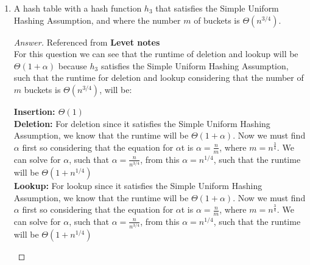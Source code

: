 \documentclass[11pt]{article}
\theoremstyle{definition}
\theoremstyle{definition}
\theoremstyle{definition}
\begin{document}
\begin{enumerate}[label=(\alph*)]
\begin{proof}[Answer]
\begin{itemize}
\begin{center}
$\Theta(1) < \Theta(\log n)$
\end{center}
\item \textbf{Deletion:} The runtime of the deletion operation for a has table that satisfies the Simple Uniform Hashing Assumption will have a runtime of $\Theta(2)$, such that the runtime of the deletion operation in a hashing function will run faster than the deletion in balanced binary tree, as follows: \\
\begin{center}
$\Theta(2) < \Theta(\log n)$
\end{center}
\item \textbf{Lookup:} The runtime of the deletion operation for a has table that satisfies the Simple Uniform Hashing Assumption will have a runtime of $\Theta(2)$, such that the runtime of the lookup operation in a hashing function will run faster than the lookup in balanced binary tree, as follows: \\
\begin{center}
$\Theta(2) <\Theta(\log n)$
\end{center}
\end{itemize}
\end{proof}
    
    \vskip 15pt	
    \item A hash table with a hash function $h_3$ that satisfies the Simple Uniform Hashing Assumption, and where the number $m$ of buckets is $\Theta(n^{3/4})$.
    \begin{proof}[Answer] Referenced from \textbf{Levet notes}\\
        For this question we can see that the runtime of deletion and lookup will be $\Theta(1+\alpha)$ because $h_3$ satisfies the Simple Uniform Hashing Assumption, such that the runtime for deletion and lookup considering that the number of $m$ buckets is $\Theta(n^{3/4})$, will be: \\
        \begin{center}
        \textbf{Insertion: $\Theta(1)$} \\
        \textbf{Deletion:} For deletion since it satisfies the Simple Uniform Hashing Assumption, we know that the runtime will be $\Theta(1+\alpha)$. Now we must find $\alpha$ first so considering that the equation for $\alpha$t is $\alpha = \frac{n}{m}$, where $m = n^{\frac{3}{4}}$. We can solve for $\alpha$, such that $\alpha = \frac{n}{n^{3/4}}$, from this $\alpha = n^{1/4}$, such that the runtime will be $\Theta(1+ n^{1/4})$ \\
        \textbf{Lookup: } For lookup since it satisfies the Simple Uniform Hashing Assumption, we know that the runtime will be $\Theta(1+\alpha)$. Now we must find $\alpha$ first so considering that the equation for $\alpha$t is $\alpha = \frac{n}{m}$, where $m = n^{\frac{3}{4}}$. We can solve for $\alpha$, such that $\alpha = \frac{n}{n^{3/4}}$, from this $\alpha =  n^{1/4}$, such that the runtime will be $\Theta(1+ n^{1/4})$ \\
        \end{center}
        

\end{proof}
\end{enumerate}
\end{document}
